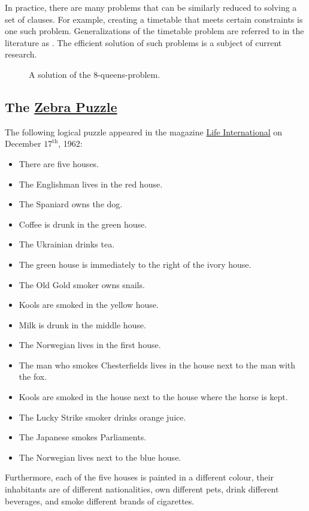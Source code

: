 In practice, there are many problems that can be similarly reduced to solving a
set of clauses. For example, creating a timetable that meets certain constraints is one such problem. Generalizations of the
timetable problem are referred to in the literature as .
The efficient solution of such problems is a subject of current research.

\begin{figure}[!ht]
  \centering
  \caption{A solution of the 8-queens-problem.}
  \label{fig:8-queens.pdf}
\end{figure}
\FloatBarrier
\pagebreak

\subsection{The \href{https://en.wikipedia.org/wiki/Zebra_Puzzle}{Zebra Puzzle} \label{section:zebra}} 
The following logical puzzle appeared in the magazine
\href{https://en.wikipedia.org/wiki/Life_(magazine)}{Life International} 
on December $17^\textrm{th}$, 1962:
\begin{itemize}
\item There are five houses.
\item The Englishman lives in the red house.
\item The Spaniard owns the dog.
\item Coffee is drunk in the green house.
\item The Ukrainian drinks tea.
\item The green house is immediately to the right of the ivory house.
\item The Old Gold smoker owns snails.
\item Kools are smoked in the yellow house.
\item Milk is drunk in the middle house.
\item The Norwegian lives in the first house.
\item The man who smokes Chesterfields lives in the house next to the man with the fox.
\item Kools are smoked in the house next to the house where the horse is kept.
\item The Lucky Strike smoker drinks orange juice.
\item The Japanese smokes Parliaments.
\item The Norwegian lives next to the blue house.
\end{itemize}
Furthermore, each of the five houses is painted in a different colour, their
inhabitants are of different nationalities, own different pets, drink different
beverages, and smoke different brands of cigarettes.  

